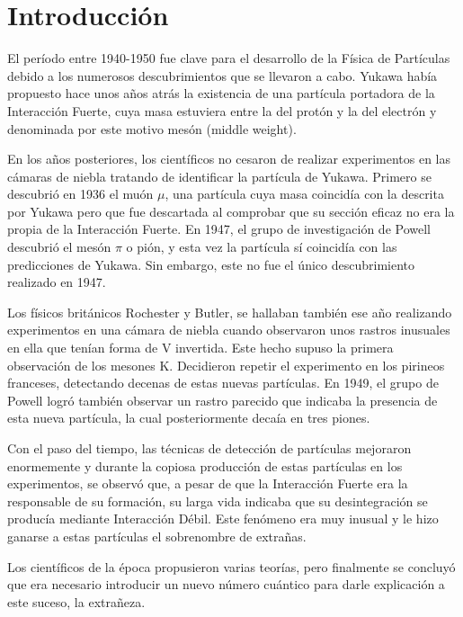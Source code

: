 \renewcommand{\listtablename}{Índice de tablas}
\renewcommand{\tablename}{Tabla}

\chapter{Introducción}\label{cap:intro}
El período entre 1940-1950 fue clave para el desarrollo de la Física de Partículas debido a los numerosos descubrimientos que se llevaron a cabo. Yukawa había propuesto hace unos años atrás la existencia de una partícula portadora de la Interacción Fuerte, cuya masa estuviera entre la del protón y la del electrón y denominada por este motivo mesón (middle weight).
 
En los años posteriores, los científicos no cesaron de realizar experimentos en las cámaras de niebla tratando de identificar la partícula de Yukawa. Primero se descubrió en 1936 el muón $\mu$, una partícula cuya masa coincidía con la descrita por Yukawa pero que fue descartada al comprobar que su sección eficaz no era la propia de la Interacción Fuerte. En 1947, el grupo de investigación de Powell descubrió el mesón $\pi$ o pión, y esta vez la partícula sí coincidía con las predicciones de Yukawa. Sin embargo, este no fue el único descubrimiento realizado en 1947.

Los físicos británicos Rochester y Butler, se hallaban también ese año realizando experimentos en una cámara de niebla cuando observaron unos rastros inusuales en ella que tenían forma de V invertida. Este hecho supuso la primera observación de los mesones K. Decidieron repetir el experimento en los pirineos franceses, detectando decenas de estas nuevas partículas. En 1949, el grupo de Powell logró también observar un rastro parecido que indicaba la presencia de esta nueva partícula, la cual posteriormente decaía en tres piones. 

Con el paso del tiempo, las técnicas de detección de partículas mejoraron enormemente y durante la copiosa producción de estas partículas en los experimentos, se observó que, a pesar de que la Interacción Fuerte era la responsable de su formación, su larga vida indicaba que su desintegración se producía mediante Interacción Débil. Este fenómeno era muy inusual y le hizo ganarse a estas partículas el sobrenombre de extrañas.

Los científicos de la época propusieron varias teorías, pero finalmente se concluyó que era necesario introducir un nuevo número cuántico para darle explicación a este suceso, la extrañeza.\cite{Bardeen2012}\cite{Griffiths2008}\\


